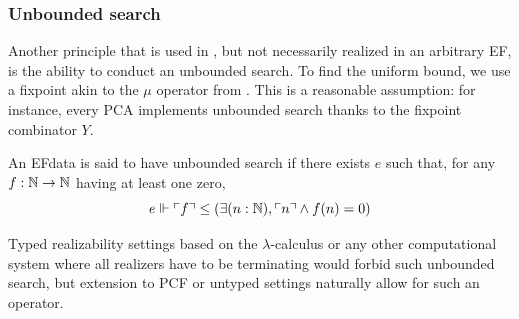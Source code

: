 \documentclass[a4paper,UKenglish,cleveref, autoref, thm-restate]{lipics-v2021}
\begin{document}
\subsubsection{Unbounded search}



Another principle that is used in , but not necessarily realized in an arbitrary EF, is the ability to conduct an unbounded search. To find the uniform bound, we use a fixpoint akin to the $\mu$ operator from \cite{Kleene1943}. This is a reasonable assumption: for instance, every PCA implements unbounded search thanks to the fixpoint combinator $Y$.









\begin{definition}
  An EFdata is said to have unbounded search if there exists $e$ such that, for any $f : \mathbb N \to \mathbb N$ having at least one zero,
  \[e \Vdash \ulcorner f\urcorner \leq (\exists (n : \mathbb N), \ulcorner n\urcorner \land f(n) = 0)\]
\end{definition}
\begin{example}
Typed realizability settings based on the $\lambda$-calculus or any other computational system where all realizers have to be
terminating would forbid such unbounded search,
but extension to PCF or untyped settings naturally allow for such an operator.
\end{example}
\end{document}
